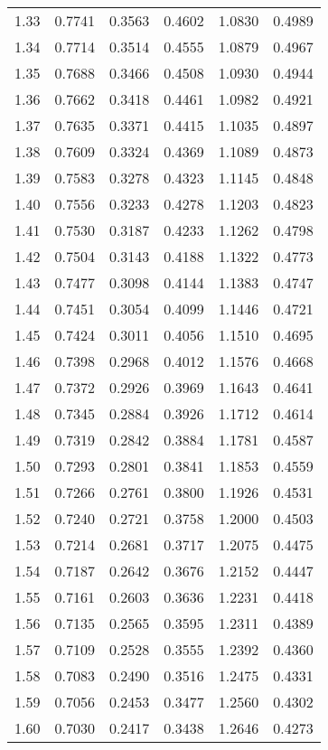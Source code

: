 \documentclass{article}
\begin{document}
\begin{longtable}{cccccc}
1.33 & 0.7741 & 0.3563 & 0.4602 & 1.0830 & 0.4989 \\
1.34 & 0.7714 & 0.3514 & 0.4555 & 1.0879 & 0.4967 \\
1.35 & 0.7688 & 0.3466 & 0.4508 & 1.0930 & 0.4944 \\
1.36 & 0.7662 & 0.3418 & 0.4461 & 1.0982 & 0.4921 \\
1.37 & 0.7635 & 0.3371 & 0.4415 & 1.1035 & 0.4897 \\
1.38 & 0.7609 & 0.3324 & 0.4369 & 1.1089 & 0.4873 \\
1.39 & 0.7583 & 0.3278 & 0.4323 & 1.1145 & 0.4848 \\
1.40 & 0.7556 & 0.3233 & 0.4278 & 1.1203 & 0.4823 \\
1.41 & 0.7530 & 0.3187 & 0.4233 & 1.1262 & 0.4798 \\
1.42 & 0.7504 & 0.3143 & 0.4188 & 1.1322 & 0.4773 \\
1.43 & 0.7477 & 0.3098 & 0.4144 & 1.1383 & 0.4747 \\
1.44 & 0.7451 & 0.3054 & 0.4099 & 1.1446 & 0.4721 \\
1.45 & 0.7424 & 0.3011 & 0.4056 & 1.1510 & 0.4695 \\
1.46 & 0.7398 & 0.2968 & 0.4012 & 1.1576 & 0.4668 \\
1.47 & 0.7372 & 0.2926 & 0.3969 & 1.1643 & 0.4641 \\
1.48 & 0.7345 & 0.2884 & 0.3926 & 1.1712 & 0.4614 \\
1.49 & 0.7319 & 0.2842 & 0.3884 & 1.1781 & 0.4587 \\
1.50 & 0.7293 & 0.2801 & 0.3841 & 1.1853 & 0.4559 \\
1.51 & 0.7266 & 0.2761 & 0.3800 & 1.1926 & 0.4531 \\
1.52 & 0.7240 & 0.2721 & 0.3758 & 1.2000 & 0.4503 \\
1.53 & 0.7214 & 0.2681 & 0.3717 & 1.2075 & 0.4475 \\
1.54 & 0.7187 & 0.2642 & 0.3676 & 1.2152 & 0.4447 \\
1.55 & 0.7161 & 0.2603 & 0.3636 & 1.2231 & 0.4418 \\
1.56 & 0.7135 & 0.2565 & 0.3595 & 1.2311 & 0.4389 \\
1.57 & 0.7109 & 0.2528 & 0.3555 & 1.2392 & 0.4360 \\
1.58 & 0.7083 & 0.2490 & 0.3516 & 1.2475 & 0.4331 \\
1.59 & 0.7056 & 0.2453 & 0.3477 & 1.2560 & 0.4302 \\
1.60 & 0.7030 & 0.2417 & 0.3438 & 1.2646 & 0.4273 \\

\end{longtable}
\end{document}
